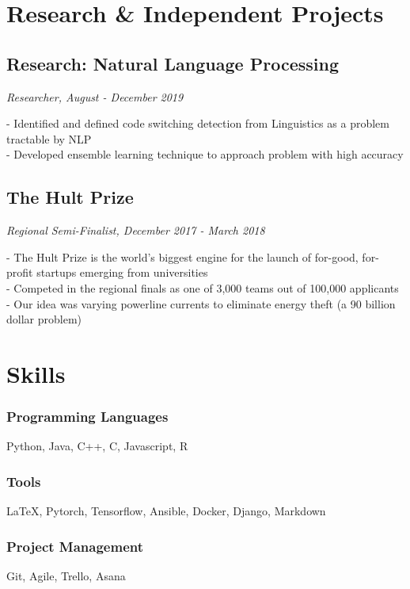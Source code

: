 \documentclass{article}
\begin{document}
\section{Research \& Independent Projects}
\vspace{.15em}

\subsection{Research: Natural Language Processing} \hfill \textit{Researcher, August - December 2019}

\noindent - Identified and defined code switching detection from Linguistics as a problem tractable by NLP\\
- Developed ensemble learning technique to approach problem with high accuracy 
 \vspace{.15em}

\subsection{The Hult Prize} \hfill \textit{Regional Semi-Finalist, December 2017 - March 2018}

\noindent - The Hult Prize is the world’s biggest engine for the launch of for-good, for-profit startups emerging from universities \\
- Competed in the regional finals as one of 3,000 teams out of 100,000 applicants \\
- Our idea was varying powerline currents to eliminate energy theft (a 90 billion dollar problem)

\section{Skills}
\vspace{.15em}

\subsubsection{Programming Languages}
Python, Java, C++, C, Javascript, R 
\subsubsection{Tools}
{\LaTeX}, Pytorch, Tensorflow, Ansible, Docker, Django, Markdown 
\subsubsection{Project Management}
Git, Agile, Trello, Asana
\end{document}
